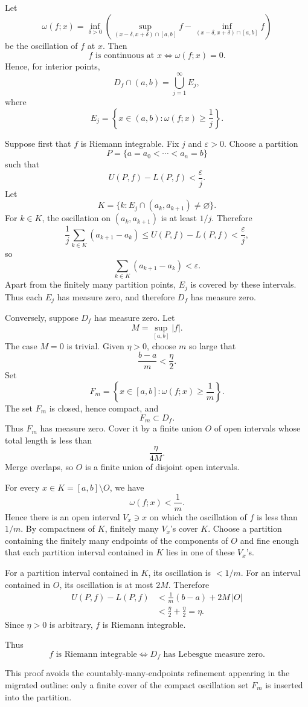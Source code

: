 \begin{solution}
Let
\[
\omega(f;x)
=
\inf_{\delta>0}
\left(
\sup_{(x-\delta,x+\delta)\cap[a,b]}f
-
\inf_{(x-\delta,x+\delta)\cap[a,b]}f
\right)
\]
be the oscillation of \(f\) at \(x\). Then
\[
f\text{ is continuous at }x
\iff
\omega(f;x)=0.
\]
Hence, for interior points,
\[
D_f\cap(a,b)
=
\bigcup_{j=1}^{\infty}E_j,
\]
where
\[
E_j
=
\left\{
x\in(a,b):
\omega(f;x)\ge\frac1j
\right\}.
\]

Suppose first that \(f\) is Riemann integrable. Fix \(j\) and \(\varepsilon>0\). Choose a partition
\[
P=\{a=a_0<\cdots<a_n=b\}
\]
such that
\[
U(P,f)-L(P,f)<\frac{\varepsilon}{j}.
\]
Let
\[
K=\{k:E_j\cap(a_k,a_{k+1})\neq\varnothing\}.
\]
For \(k\in K\), the oscillation on \((a_k,a_{k+1})\) is at least \(1/j\). Therefore
\[
\frac1j
\sum_{k\in K}(a_{k+1}-a_k)
\le
U(P,f)-L(P,f)
<
\frac{\varepsilon}{j},
\]
so
\[
\sum_{k\in K}(a_{k+1}-a_k)<\varepsilon.
\]
Apart from the finitely many partition points, \(E_j\) is covered by these intervals. Thus each \(E_j\) has measure zero, and therefore \(D_f\) has measure zero.

Conversely, suppose \(D_f\) has measure zero. Let
\[
M=\sup_{[a,b]}|f|.
\]
The case \(M=0\) is trivial. Given \(\eta>0\), choose \(m\) so large that
\[
\frac{b-a}{m}<\frac{\eta}{2}.
\]
Set
\[
F_m=\left\{x\in[a,b]:\omega(f;x)\ge\frac1m\right\}.
\]
The set \(F_m\) is closed, hence compact, and
\[
F_m\subset D_f.
\]
Thus \(F_m\) has measure zero. Cover it by a finite union \(O\) of open intervals whose total length is less than
\[
\frac{\eta}{4M}.
\]
Merge overlaps, so \(O\) is a finite union of disjoint open intervals.

For every \(x\in K=[a,b]\setminus O\), we have
\[
\omega(f;x)<\frac1m.
\]
Hence there is an open interval \(V_x\ni x\) on which the oscillation of \(f\) is less than \(1/m\). By compactness of \(K\), finitely many \(V_x\)'s cover \(K\). Choose a partition containing the finitely many endpoints of the components of \(O\) and fine enough that each partition interval contained in \(K\) lies in one of these \(V_x\)'s.

For a partition interval contained in \(K\), its oscillation is \(<1/m\). For an interval contained in \(O\), its oscillation is at most \(2M\). Therefore
\[
\begin{aligned}
U(P,f)-L(P,f)
&<
\frac1m(b-a)
+
2M\,|O|\\
&<
\frac{\eta}{2}
+
\frac{\eta}{2}
=
\eta.
\end{aligned}
\]
Since \(\eta>0\) is arbitrary, \(f\) is Riemann integrable.

Thus
\[
\boxed{
f\text{ is Riemann integrable}
\iff
D_f\text{ has Lebesgue measure zero}.
}
\]

This proof avoids the countably-many-endpoints refinement appearing in the migrated outline: only a finite cover of the compact oscillation set \(F_m\) is inserted into the partition.
\end{solution}



